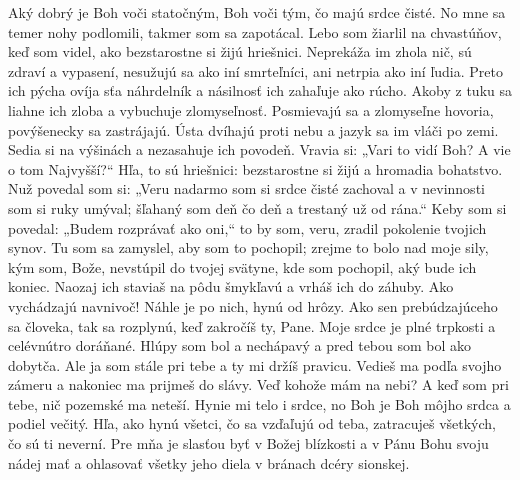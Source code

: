 Aký dobrý je Boh voči statočným,
Boh voči tým, čo majú srdce čisté.
\versseparator
No mne sa temer nohy podlomili,
takmer som sa zapotácal.
\versseparator
Lebo som žiarlil na chvastúňov,
keď som videl, ako bezstarostne si žijú hriešnici.
\versseparator
Neprekáža im zhola nič,
sú zdraví a vypasení,
\versseparator
nesužujú sa ako iní smrteľníci,
ani netrpia ako iní ľudia.
\versseparator
Preto ich pýcha ovíja sťa náhrdelník
a násilnosť ich zahaľuje ako rúcho.
\versseparator
Akoby z tuku sa liahne ich zloba
a vybuchuje zlomyseľnosť.
\versseparator
Posmievajú sa a zlomyseľne hovoria,
povýšenecky sa zastrájajú.
\versseparator
Ústa dvíhajú proti nebu
a jazyk sa im vláči po zemi.
\versseparator
Sedia si na výšinách
a nezasahuje ich povodeň.
\versseparator
Vravia si: „Vari to vidí Boh?
A vie o tom Najvyšší?“
\versseparator
Hľa, to sú hriešnici: bezstarostne si žijú
a hromadia bohatstvo.
\versseparator
Nuž povedal som si: „Veru nadarmo som si srdce čisté zachoval
a v nevinnosti som si ruky umýval;
\versseparator
šľahaný som deň čo deň
a trestaný už od rána.“
\versseparator
Keby som si povedal: „Budem rozprávať ako oni,“
to by som, veru, zradil pokolenie tvojich synov.
\versseparator
Tu som sa zamyslel, aby som to pochopil;
zrejme to bolo nad moje sily,
\versseparator
kým som, Bože, nevstúpil do tvojej svätyne,
kde som pochopil, aký bude ich koniec.
\versseparator
Naozaj ich staviaš na pôdu šmykľavú
a vrháš ich do záhuby.
\versseparator
Ako vychádzajú navnivoč!
Náhle je po nich, hynú od hrôzy.
\versseparator
Ako sen prebúdzajúceho sa človeka,
tak sa rozplynú, keď zakročíš ty, Pane.
\versseparator
Moje srdce je plné trpkosti
a celévnútro doráňané.
Hlúpy som bol a nechápavý
\versseparator
a pred tebou som bol ako dobytča.
Ale ja som stále pri tebe
\versseparator
a ty mi držíš pravicu.
Vedieš ma podľa svojho zámeru
a nakoniec ma prijmeš do slávy.
\versseparator
Veď kohože mám na nebi?
A keď som pri tebe, nič pozemské ma neteší.
\versseparator
Hynie mi telo i srdce,
no Boh je Boh môjho srdca a podiel večitý.
\versseparator
Hľa, ako hynú všetci, čo sa vzďaľujú od teba,
zatracuješ všetkých, čo sú ti neverní.
\versseparator
Pre mňa je slasťou byť v Božej blízkosti
a v Pánu Bohu svoju nádej mať
\versseparator
a ohlasovať všetky jeho diela
v bránach dcéry sionskej.